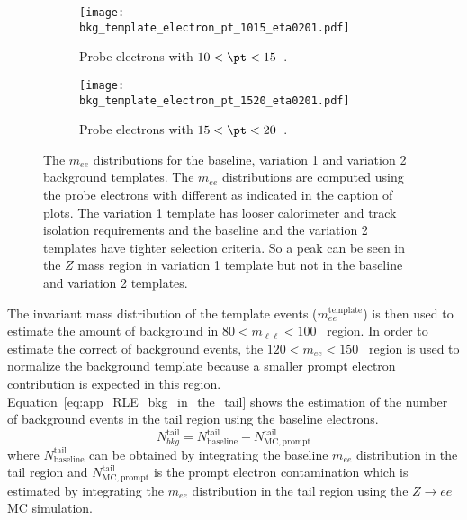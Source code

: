 \begin{figure}[htbp]
    \begin{subfigure}[b]{0.48\textwidth}
        \begin{center}
            \texttt{[image: bkg\_template\_electron\_pt\_1015\_eta0201.pdf]}
            \caption{Probe electrons with $10 < \pt < 15$~{\GeV}.}
        \end{center}
    \end{subfigure}
    \begin{subfigure}[b]{0.48\textwidth}
        \begin{center}
            \texttt{[image: bkg\_template\_electron\_pt\_1520\_eta0201.pdf]}
            \caption{Probe electrons with $15 < \pt < 20$~{\GeV}.}
        \end{center}
    \end{subfigure}
    \caption{The $m_{ee}$ distributions for the baseline, variation 1 and variation 2 background templates.
    The $m_{ee}$ distributions are computed using the probe electrons with different \pt as indicated in the caption of plots.
    The variation 1 template has looser calorimeter and track isolation requirements and the baseline and the variation 2 templates have tighter selection criteria.
    So a peak can be seen in the $Z$ mass region in variation 1 template but not in the baseline and variation 2 templates.}
    \label{fig:app_RLE_bkg_templates}
\end{figure}
%
The invariant mass distribution of the template events ($m_{ee}^\mathrm{template}$) is then used to estimate the amount of background in $80 < m_{\ell \ell} < 100$~{\GeV} region.
In order to estimate the correct of background events, the $120 < m_{ee} < 150$~{\GeV} region is used to normalize the background template because a smaller prompt electron contribution is expected in this region.
Equation~\ref{eq:app_RLE_bkg_in_the_tail} shows the estimation of the number of background events in the tail region using the baseline electrons.
%
\begin{equation}
    N_{bkg}^\mathrm{tail} = N_\mathrm{baseline}^\mathrm{tail} - N_\mathrm{MC, prompt}^\mathrm{tail}
    \label{eq:app_RLE_bkg_in_the_tail}
\end{equation}
%
where $N_\mathrm{baseline}^\mathrm{tail}$ can be obtained by integrating the baseline $m_{ee}$ distribution in the tail region and $N_\mathrm{MC, prompt}^\mathrm{tail}$ is the prompt electron contamination which is estimated by integrating the $m_{ee}$ distribution in the tail region using the $Z \to ee$ MC simulation.
